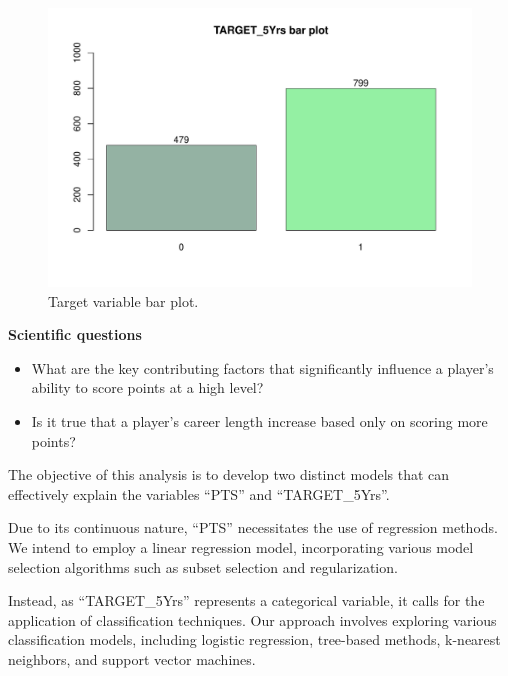 \begin{figure}[H]
	\centering
	\includegraphics[width=0.5\linewidth]{ImageFiles/Histograms/bp_target5yrs.pdf}
	\caption{Target variable bar plot.}
	\label{fig:target_bar_plot}
\end{figure}

\textbf{Scientific questions}
\begin{itemize}
	\item What are the key contributing factors that significantly influence a player's ability to score points at a high level?
	\item Is it true that a player's career length increase based only on scoring more points?
\end{itemize}

\noindent
The objective of this analysis is to develop two distinct models that can effectively explain the variables ``PTS'' and ``TARGET\_5Yrs''. 
 
Due to its continuous nature, ``PTS'' necessitates the use of regression methods. We intend to employ a linear regression model, incorporating various model selection algorithms such as subset selection and regularization.

Instead, as ``TARGET\_5Yrs'' represents a categorical variable, it calls for the application of classification techniques. Our approach involves exploring various classification models, including logistic regression, tree-based methods, k-nearest neighbors, and support vector machines.